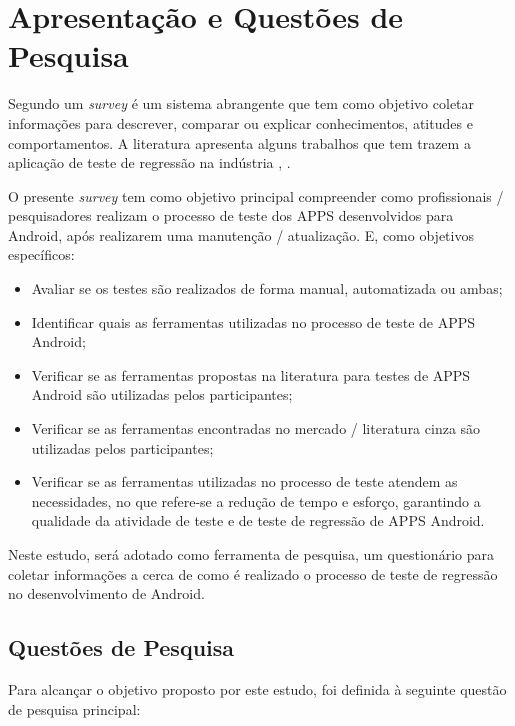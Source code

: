 \acresetall 

\section{Apresentação e Questões de Pesquisa}

Segundo \cite{PSK2001} um \textit{survey} é um sistema abrangente que tem como objetivo coletar informações para descrever, comparar ou explicar conhecimentos, atitudes e comportamentos. A literatura apresenta alguns trabalhos que tem trazem a aplicação de teste de regressão na indústria \cite{Ali2019}, \cite{630875}.


O presente \textit{survey} tem como objetivo principal compreender como profissionais / pesquisadores realizam o processo de teste dos \ac{APPS} desenvolvidos para Android, após realizarem uma manutenção / atualização. E, como objetivos específicos:

\begin{itemize}
    \item Avaliar se os testes são realizados de forma manual, automatizada ou ambas;
    \item Identificar quais as ferramentas utilizadas no processo de teste de \ac{APPS} Android;
    \item Verificar se as ferramentas propostas na literatura para testes de \ac{APPS} Android são utilizadas pelos participantes;
    \item Verificar se as ferramentas encontradas no mercado / literatura cinza são utilizadas pelos participantes;
    \item Verificar se as ferramentas utilizadas no processo de teste atendem as necessidades, no que refere-se a redução de tempo e esforço, garantindo a qualidade da atividade de teste e de teste de regressão de \ac{APPS} Android.
\end{itemize}

Neste estudo, será adotado como ferramenta de pesquisa, um questionário para coletar informações a cerca de como é realizado o processo de teste de regressão no desenvolvimento de  Android.

\subsection{Questões de Pesquisa}
Para alcançar o objetivo proposto por este estudo, foi definida à seguinte questão de pesquisa principal:
\leavevspace 

\begin{center}
    \noindent{}
\end{center}

